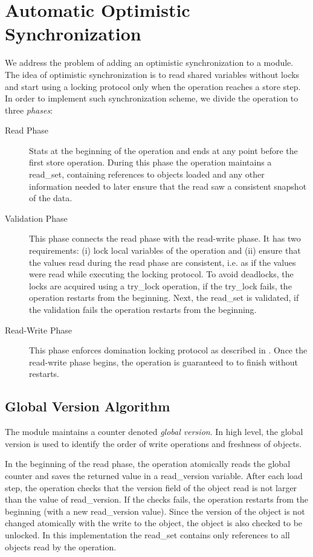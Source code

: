 \documentclass{article}
\newcommand{\code}[1]{\textsf{#1}}
\newcommand{\readV}{\code{read\_version}\xspace}
\newcommand{\readSet}{\code{read\_set}\xspace}
\begin{document}
\section{Automatic Optimistic Synchronization}
We address the problem of adding an 
optimistic synchronization to a module. 
The idea of optimistic synchronization is to read 
shared variables without locks and start using a 
locking protocol only when the operation reaches a store step. 
In order to implement such synchronization scheme, 
we divide the operation to three \emph{phases}:
\begin{description}
  \item[Read Phase] Stats at the beginning of the operation and
  ends at any point before the first store operation. 
  During this phase the operation maintains a \readSet, containing references to
  objects loaded and any other information needed to later ensure that the read saw 
  a consistent snapshot of the data. 
  
  \item[Validation Phase] This phase connects the read phase
  with the read-write phase. It has two requirements: (i) lock 
  local variables of the operation and (ii) ensure that the 
  values read during the read phase are consistent, i.e.
  as if the values were read while executing the locking 
  protocol. To avoid deadlocks, the locks are acquired using 
  a \code{try\_lock} operation, if the \code{try\_lock} fails, 
  the operation restarts from the beginning. Next, the \readSet 
  is validated, if the validation fails the operation restarts from the
  beginning.
  
  \item[Read-Write Phase] This phase enforces domination 
  locking protocol as described in \cite{Gueta2011}. Once 
  the read-write phase begins, the operation is guaranteed to to 
  finish without restarts.  
\end{description}

\subsection{Global Version Algorithm}
The module maintains a counter denoted \emph{global version}.
In high level, the global version is used to identify 
the order of write operations and freshness of objects.   

In the beginning of the read phase, the operation atomically
reads the global counter and saves the returned value in 
a \readV variable. After each load step, the
operation checks that the version field of the object read
is not larger than the value of \readV. If the checks fails,
the operation restarts from the beginning 
(with a new \readV value). Since the version of the object 
is not changed atomically with the write to the object, 
the object is also checked to be unlocked. 
In this implementation the \readSet contains only 
references to all objects read by the operation.
 
\end{document}
